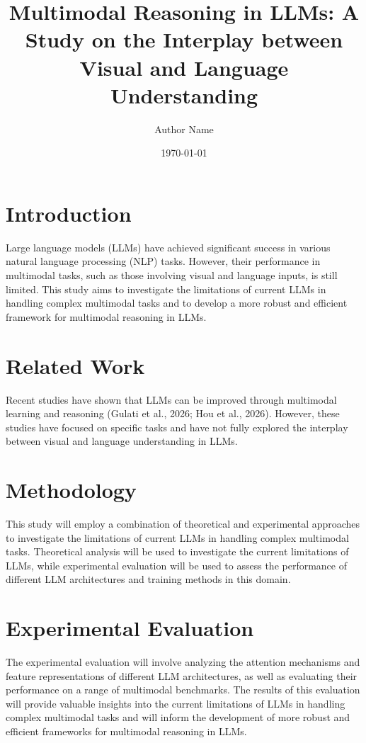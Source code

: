 \documentclass{article}
\title{Multimodal Reasoning in LLMs: A Study on the Interplay between Visual and Language Understanding}
\author{Author Name}
\date{\today}
\begin{document}
\maketitle

\section{Introduction}
Large language models (LLMs) have achieved significant success in various natural language processing (NLP) tasks. However, their performance in multimodal tasks, such as those involving visual and language inputs, is still limited. This study aims to investigate the limitations of current LLMs in handling complex multimodal tasks and to develop a more robust and efficient framework for multimodal reasoning in LLMs.

\section{Related Work}
Recent studies have shown that LLMs can be improved through multimodal learning and reasoning (Gulati et al., 2026; Hou et al., 2026). However, these studies have focused on specific tasks and have not fully explored the interplay between visual and language understanding in LLMs.

\section{Methodology}
This study will employ a combination of theoretical and experimental approaches to investigate the limitations of current LLMs in handling complex multimodal tasks. Theoretical analysis will be used to investigate the current limitations of LLMs, while experimental evaluation will be used to assess the performance of different LLM architectures and training methods in this domain.

\section{Experimental Evaluation}
The experimental evaluation will involve analyzing the attention mechanisms and feature representations of different LLM architectures, as well as evaluating their performance on a range of multimodal benchmarks. The results of this evaluation will provide valuable insights into the current limitations of LLMs in handling complex multimodal tasks and will inform the development of more robust and efficient frameworks for multimodal reasoning in LLMs.
\end{document}
